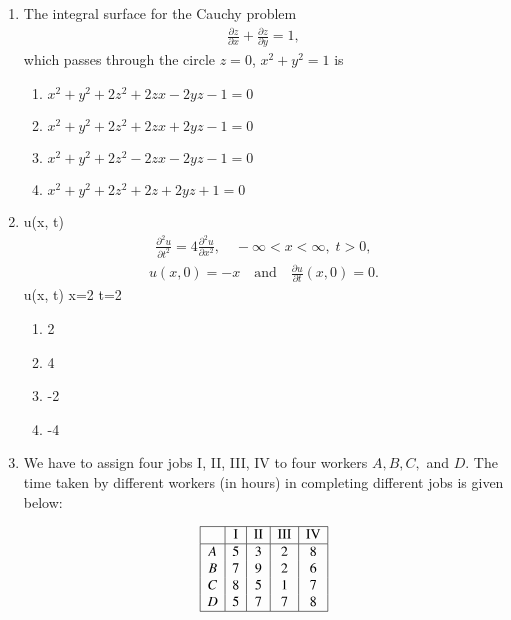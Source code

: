 \documentclass[journal]{IEEEtran}
\numberwithin{equation}{enumi}
\numberwithin{figure}{enumi}
\begin{document}
\begin{enumerate}
    
\item The integral surface for the Cauchy problem
\begin{align*}
\frac{\partial z}{\partial x} + \frac{\partial z}{\partial y} = 1,
\end{align*}
which passes through the circle $z = 0$, $x^2 + y^2 = 1$ is
\hfill{}
\begin{enumerate}
    \item $x^2 + y^2 + 2z^2 + 2zx - 2yz - 1 = 0$
    \item $x^2 + y^2 + 2z^2 + 2zx + 2yz - 1 = 0$
    \item $x^2 + y^2 + 2z^2 - 2zx - 2yz - 1 = 0$
    \item $x^2 + y^2 + 2z^2 + 2z + 2yz + 1 = 0$
\end{enumerate}


 
\item {} u(x, t) 
\begin{align*}
\frac{\partial^2 u}{\partial t^2} = 4 \frac{\partial^2 u}{\partial x^2}, \quad -\infty < x < \infty, \; t > 0,
\end{align*}
\begin{align*}
u(x, 0) = -x \quad \text{and} \quad \frac{\partial u}{\partial t}(x, 0) = 0.
\end{align*}
 u(x, t)  x=2  t=2 
\hfill{}
\begin{multicols}{4}
\begin{enumerate}
\item  2
\item  4 
\item  -2 
\item  -4
\end{enumerate}
\end{multicols}






\item We have to assign four jobs I, II, III, IV to four workers $A, B, C,$ and $D$. The time taken by different workers (in hours) in completing different jobs is given below:

\begin{align*}
\begin{array}{|c|c|c|c|c|}
   \hline
    & \text{I} & \text{II} & \text{III} & \text{IV} \\
    \hline
    A & 5 & 3 & 2 & 8 \\
    B & 7 & 9 & 2 & 6 \\
    C & 8 & 5 & 1 & 7 \\
    D & 5 & 7 & 7 & 8 \\
    \hline
\end{array}
\end{align*}


\end{enumerate}
\end{document}
